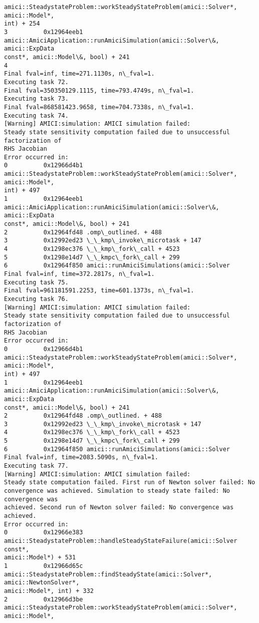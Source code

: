 \documentclass[11pt]{article}
\begin{document}
\begin{Verbatim}[commandchars=\\\{\}]
amici::SteadystateProblem::workSteadyStateProblem(amici::Solver*, amici::Model*,
int) + 254
3          0x12964eeb1
amici::AmiciApplication::runAmiciSimulation(amici::Solver\&, amici::ExpData
const*, amici::Model\&, bool) + 241
4
Final fval=inf, time=271.1130s, n\_fval=1.
Executing task 72.
Final fval=350350129.1115, time=793.4749s, n\_fval=1.
Executing task 73.
Final fval=868581423.9658, time=704.7338s, n\_fval=1.
Executing task 74.
[Warning] AMICI:simulation: AMICI simulation failed:
Steady state sensitivity computation failed due to unsuccessful factorization of
RHS Jacobian
Error occurred in:
0          0x12966d4b1
amici::SteadystateProblem::workSteadyStateProblem(amici::Solver*, amici::Model*,
int) + 497
1          0x12964eeb1
amici::AmiciApplication::runAmiciSimulation(amici::Solver\&, amici::ExpData
const*, amici::Model\&, bool) + 241
2          0x12964fd48 .omp\_outlined. + 488
3          0x12992ed23 \_\_kmp\_invoke\_microtask + 147
4          0x1298ec376 \_\_kmp\_fork\_call + 4523
5          0x1298e14d7 \_\_kmpc\_fork\_call + 299
6          0x12964f850 amici::runAmiciSimulations(amici::Solver
Final fval=inf, time=372.2817s, n\_fval=1.
Executing task 75.
Final fval=961181591.2253, time=601.1373s, n\_fval=1.
Executing task 76.
[Warning] AMICI:simulation: AMICI simulation failed:
Steady state sensitivity computation failed due to unsuccessful factorization of
RHS Jacobian
Error occurred in:
0          0x12966d4b1
amici::SteadystateProblem::workSteadyStateProblem(amici::Solver*, amici::Model*,
int) + 497
1          0x12964eeb1
amici::AmiciApplication::runAmiciSimulation(amici::Solver\&, amici::ExpData
const*, amici::Model\&, bool) + 241
2          0x12964fd48 .omp\_outlined. + 488
3          0x12992ed23 \_\_kmp\_invoke\_microtask + 147
4          0x1298ec376 \_\_kmp\_fork\_call + 4523
5          0x1298e14d7 \_\_kmpc\_fork\_call + 299
6          0x12964f850 amici::runAmiciSimulations(amici::Solver
Final fval=inf, time=2083.5090s, n\_fval=1.
Executing task 77.
[Warning] AMICI:simulation: AMICI simulation failed:
Steady state computation failed. First run of Newton solver failed: No
convergence was achieved. Simulation to steady state failed: No convergence was
achieved. Second run of Newton solver failed: No convergence was achieved.
Error occurred in:
0          0x12966e383
amici::SteadystateProblem::handleSteadyStateFailure(amici::Solver const*,
amici::Model*) + 531
1          0x12966d65c
amici::SteadystateProblem::findSteadyState(amici::Solver*, amici::NewtonSolver*,
amici::Model*, int) + 332
2          0x12966d3be
amici::SteadystateProblem::workSteadyStateProblem(amici::Solver*, amici::Model*,

\end{Verbatim}
\end{document}
